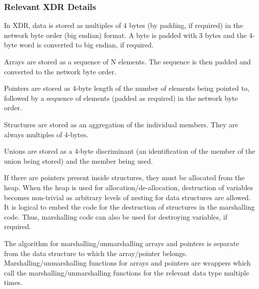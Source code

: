 \begin{flushleft}
\subsubsection{Relevant XDR Details}
In XDR, data is stored as multiples of 4 bytes (by padding, if required) in the network byte order (big endian) format. A byte is padded with 3
bytes and the 4-byte word is converted to big endian, if required.
\par
Arrays are stored as a sequence of N elements. The sequence is then padded and converted to the network byte order.
\par
Pointers are stored as 4-byte length of the number of elements being pointed to, followed by a sequence of elements (padded as required) in the 
network byte order.
\par
Structures are stored as an aggregation of the individual members. They are always multiples of 4-bytes.
\par
Unions are stored as a 4-byte discriminant (an identification of the member of the union being stored) and the member being used.
\par
If there are pointers present inside structures, they must be allocated from the heap. When the heap is used for allocation/de-allocation, destruction 
of variables becomes non-trivial as arbitrary levels of nesting for data structures are allowed. It is logical to embed the code for the destruction of 
structures in the marshalling code. Thus, marshalling code can also be used for destroying variables, if required.
\par
The algorithm for marshalling/unmarshalling arrays and pointers is separate from the data structure to which the array/pointer belongs. 
Marshalling/unmarshalling functions for arrays and pointers are wrappers which call the marshalling/unmarshalling functions for the relevant data type 
multiple times.

\end{flushleft}
